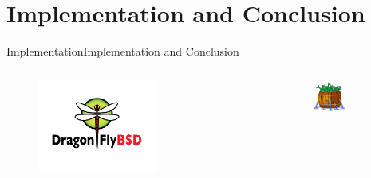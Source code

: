 \documentclass[10pt]{beamer}
\begin{document}
\section{Implementation and Conclusion}
\begin{frame}{Implementation}{Implementation and Conclusion}
  \begin{columns}[T]
    \begin{column}{.5\textwidth}
      \begin{figure}[ht]
        \centering
        \includegraphics[width=0.6\textwidth, keepaspectratio=true]{images/DragonFlyBSD.png}
      \end{figure}
    \end{column}

    \pause

    \hfill
    \begin{column}{.5\textwidth}
      \begin{figure}[ht]
        \centering
        \includegraphics[width=0.5\textwidth, keepaspectratio=true]{images/barrelfish.png}
      \end{figure}
    \end{column}
  \end{columns}
\end{frame}

{\1
\begin{frame}

\end{frame}}
\end{document}
